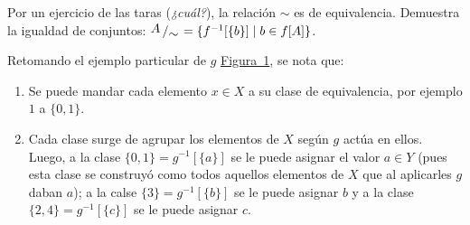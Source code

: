 \documentclass[letterpaper,DIV=14,headsepline,12pt]{scrartcl}
\newcommand{\pts}{}
\newenvironment{ejercicio}[1]{\ifthenelse{\equal{#1}{1} \OR \equal{#1}{+1}}{\renewcommand{\pts}{\textbf{(#1 pt)}}}{\renewcommand{\pts}{\textbf{(#1 pts)}}}\begin{ejj}\upshape \pts}{\end{ejj}}
\providecommand\tq{\;|\;}
\newcommand{\quot}[2]{{\raisebox{.2em}{$#1$}\left/\raisebox{-.2em}{$#2$}\right.}}
\begin{document}
    \begin{ejercicio}{1.5}\label{ej:rela}
        Por un ejercicio de las taras (\textit{¿cuál?}), la relación $\sim$ es de equivalencia. Demuestra la igualdad de conjuntos: $\quot{A}{\sim}=\{ f^{-1}[\{b\}] \tq b \in f[A] \}$.
    \end{ejercicio}

    Retomando el ejemplo particular de $g$ \hyperref[fig:ejemplo]{Figura~1}, se nota que:
    \begin{enumerate}
        \item Se puede mandar cada elemento $x\in X$ a su clase de equivalencia, por ejemplo $1$ a $\{0,1\}$.
        \item Cada clase surge de agrupar los elementos de $X$ según $g$ actúa en ellos. Luego, a la clase $\{0,1\}=g^{-1}[\{a\}]$ se le puede asignar el valor $a \in Y$ (pues esta clase se construyó como todos aquellos elementos de $X$ que al aplicarles $g$ daban $a$); a la calse $\{3\}=g^{-1}[\{b\}]$ se le puede asignar $b$ y a la clase $\{2,4\}=g^{-1}[\{c\}]$ se le puede asignar $c$.
    \end{enumerate}
\end{document}
